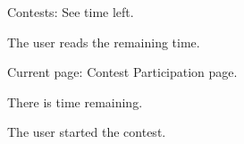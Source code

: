\begin{uc}{Contests: See time left.}

    \begin{uc-mss}
    \item The user reads the remaining time. 
    \end{uc-mss}

    \begin{uc-pre}
    \item Current page: Contest Participation page.
    \item There is time remaining. 
    \end{uc-pre}

    \begin{uc-trig}
    The user started the contest. 
    \end{uc-trig}

\end{uc}